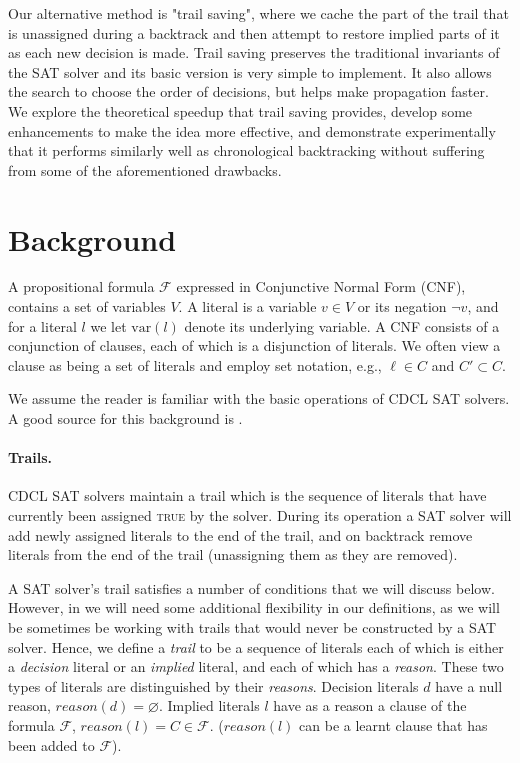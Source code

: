 \documentclass[runningheads]{llncs}
\newcommand{\sat}{SAT\xspace}
\newcommand{\var}{\text{var}}
\newcommand{\true}{\textsc{true}\xspace}
\newcommand{\reason}[1]{\ensuremath{\mathit{reason}(#1)}}
\newcommand{\formula}{\ensuremath{\mathcal{F}}}
\begin{document}
Our alternative method is "trail saving", where we cache the part of
the trail that is unassigned during a backtrack and then attempt to
restore implied parts of it as each new decision is made. Trail saving
preserves the traditional invariants of the SAT solver and its basic
version is very simple to implement. It also allows the search to
choose the order of decisions, but helps make propagation faster. We
explore the theoretical speedup that trail saving provides, develop
some enhancements to make the idea more effective, and demonstrate
experimentally that it performs similarly well as chronological
backtracking without suffering from some of the aforementioned
drawbacks.

\section{Background}
A propositional formula $\formula$ expressed in Conjunctive Normal
Form (CNF), contains a set of variables $V$. A literal is a variable
$v\in V$ or its negation $\lnot v$, and for a literal $l$ we let
$\var(l)$ denote its underlying variable. A CNF consists of a
conjunction of clauses, each of which is a disjunction of literals. We
often view a clause as being a set of literals and employ set
notation, e.g., $\ell\in C$ and $C'\subset C$.

We assume the reader is familiar with the basic operations of CDCL
\sat solvers. A good source for this background is
\cite{DBLP:series/faia/SilvaLM09}.

\paragraph{Trails.}
CDCL \sat solvers maintain a trail which is the sequence of literals
that have currently been assigned \true by the solver. During its
operation a \sat solver will add newly assigned literals to the end of
the trail, and on backtrack remove literals from the end of the trail
(unassigning them as they are removed).

A \sat solver's trail satisfies a number of conditions that we will
discuss below. However, in we will need some additional flexibility in
our definitions, as we will be sometimes be working with trails that
would never be constructed by a \sat solver. Hence, we define a
\emph{trail} to be a sequence of literals each of which is either a
\emph{decision} literal or an \emph{implied} literal, and each of
which has a \emph{reason}. These two types of literals are
distinguished by their \emph{reasons}. Decision literals $d$ have a
null reason, $\reason{d} = \varnothing$. Implied literals $l$ have as
a reason a clause of the formula $\formula$,
$\reason{l} = C\in\formula$. ($\reason{l}$ can be a learnt clause that
has been added to $\formula$).
\end{document}
